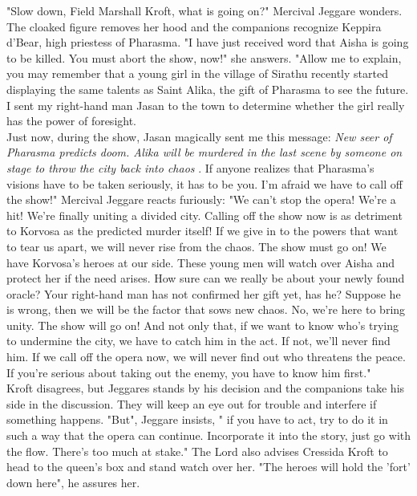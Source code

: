 "Slow down, Field Marshall Kroft, what is going on?" Mercival Jeggare wonders.\\

The cloaked figure removes her hood and the companions recognize Keppira d'Bear, high priestess of Pharasma. "I have just received word that Aisha is going to be killed. You must abort the show, now!" she answers. "Allow me to explain, you may remember that a young girl in the village of Sirathu recently started displaying the same talents as Saint Alika, the gift of Pharasma to see the future. I sent my right-hand man Jasan to the town to determine whether the girl really has the power of foresight.\\

Just now, during the show, Jasan magically sent me this message: {\itshape New seer of Pharasma predicts doom. Alika will be murdered in the last scene by someone on stage to throw the city back into chaos} . If anyone realizes that Pharasma's visions have to be taken seriously, it has to be you. I'm afraid we have to call off the show!" Mercival Jeggare reacts furiously: "We can't stop the opera! We're a hit! We're finally uniting a divided city. Calling off the show now is as detriment to Korvosa as the predicted murder itself! If we give in to the powers that want to tear us apart, we will never rise from the chaos. The show must go on! We have Korvosa's heroes at our side. These young men will watch over Aisha and protect her if the need arises. How sure can we really be about your newly found oracle? Your right-hand man has not confirmed her gift yet, has he? Suppose he is wrong, then we will be the factor that sows new chaos. No, we're here to bring unity. The show will go on! And not only that, if we want to know who's trying to undermine the city, we have to catch him in the act. If not, we'll never find him. If we call off the opera now, we will never find out who threatens the peace. If you're serious about taking out the enemy, you have to know him first."\\

Kroft disagrees, but Jeggares stands by his decision and the companions take his side in the discussion. They will keep an eye out for trouble and interfere if something happens. "But", Jeggare insists, " if you have to act, try to do it in such a way that the opera can continue. Incorporate it into the story, just go with the flow. There's too much at stake." The Lord also advises Cressida Kroft to head to the queen's box and stand watch over her. "The heroes will hold the 'fort' down here", he assures her.\\

